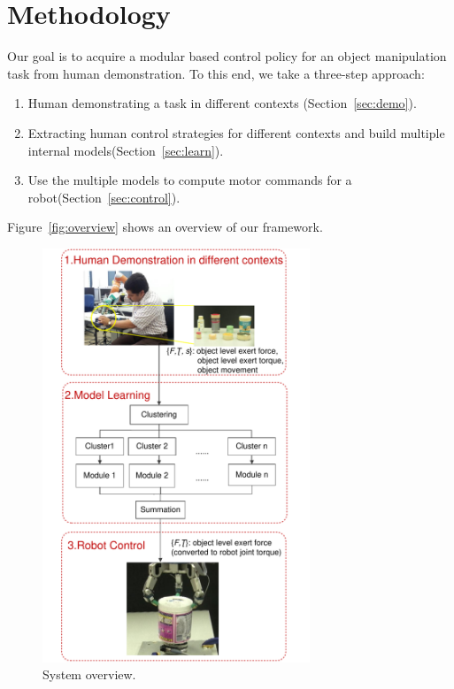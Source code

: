 \section{Methodology}
\label{sec:method}
Our goal is to acquire a modular based control policy for an object manipulation task from human demonstration. To this end, we take a three-step approach:
\begin{enumerate}
\item Human demonstrating a task in different contexts (Section~\ref{sec:demo}).
\item Extracting human control strategies for different contexts and build multiple internal models(Section~\ref{sec:learn}).
\item Use the multiple models to compute motor commands for a robot(Section~\ref{sec:control}).
\end{enumerate}

Figure~\ref{fig:overview} shows an overview of our framework.

\begin{figure}
  \centering
   \includegraphics[width=8cm]{./fig/overview3.pdf}
  \caption{ \scriptsize{System overview.}
  \label{fig:overview}
}
\label{fig:demo}
\end{figure}

